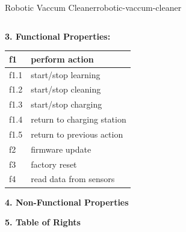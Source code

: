 \documentclass[12pt]{article}
\begin{document}
\begin{example}{Robotic Vaccum Cleaner}{robotic-vaccum-cleaner}
\begin{table}[H]
\begin{tabular}{|c|c|c|}
      \hline
    \end{tabular}
  \end{table}
  \textbf{3. Functional Properties:}
  \begin{table}[H]
    \centering
    \begin{tabular}{|l|l|}
      \hline
      f1 & perform action \\
      \hline
      f1.1 & start/stop learning \\
      \hline
      f1.2 & start/stop cleaning \\
      \hline
      f1.3 & start/stop charging \\
      \hline
      f1.4 & return to charging station \\
      \hline
      f1.5 & return to previous action \\
      \hline
      f2 & firmware update \\
      \hline
      f3 & factory reset \\
      \hline
      f4 & read data from sensors \\
      \hline
    \end{tabular}
  \end{table}
  \textbf{4. Non-Functional Properties}

  \textbf{5. Table of Rights}


\end{example}
\end{document}
